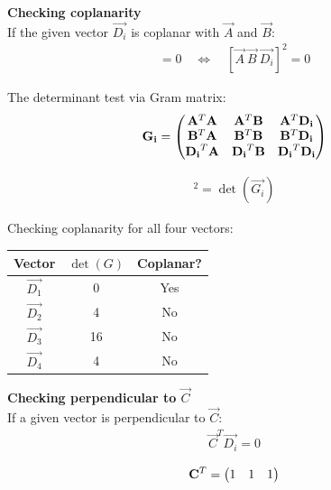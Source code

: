 \documentclass[12pt]{article}
\begin{document}
\newpage
\textbf{\large Checking coplanarity} \\[1cm]

If the given vector $\vec{D_i}$ is coplanar with $\vec{A}$ and $\vec{B}$:
\begin{align}
  [\vec{A}\ \vec{B}\ \vec{D_i}] = 0 \quad \Longleftrightarrow \quad [\vec{A}\ \vec{B}\ \vec{D_i}]^2 = 0
\end{align}

The determinant test via Gram matrix:
\begin{align}
    \mathbf{G_i} = \begin{pmatrix}
    {\mathbf{A}}^T\mathbf{A} & {\mathbf{A}}^T\mathbf{B} & {\mathbf{A}}^T\mathbf{D_i} \\
    {\mathbf{B}}^T\mathbf{A} & {\mathbf{B}}^T\mathbf{B} & {\mathbf{B}}^T\mathbf{D_i} \\
    {\mathbf{D_i}}^T\mathbf{A} & {\mathbf{D_i}}^T\mathbf{B} & {\mathbf{D_i}}^T\mathbf{D_i}
    \end{pmatrix}
\end{align}

\begin{align}
    [\vec{A}\ \vec{B}\ \vec{D_i}]^2 = \det(\vec{G_i})
\end{align}


Checking coplanarity for all four vectors:
\begin{center}
\begin{tabular}{|c|c|c|}
\hline
Vector & $\det(G)$ & Coplanar? \\ \hline
$\vec{D_1}$ & 0  & Yes \\ \hline
$\vec{D_2}$ & 4  & No  \\ \hline
$\vec{D_3}$ & 16 & No  \\ \hline
$\vec{D_4}$ & 4  & No  \\ \hline
\end{tabular}
\end{center}

\newpage
\textbf{\large Checking perpendicular to $\vec{C}$} \\[1cm]

If a given vector is perpendicular to $\vec{C}$:
\begin{align}
    {\vec{C}}^T \vec{D_i} = 0
\end{align}

\begin{align}
    {\mathbf{C}}^T = \begin{pmatrix}1 & 1 & 1\end{pmatrix}
\end{align}
\end{document}
